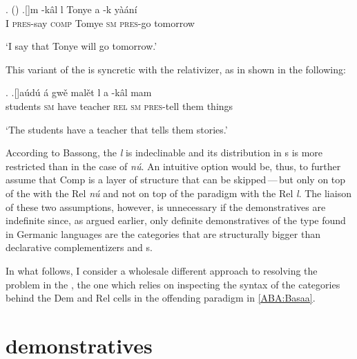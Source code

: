\ex.  (\citealt[ex. 30a in \S3]{Bassong2010})\label{bassong-ch3}
\ag.[]\hspace{-22pt}m -k\^al l Tonye a -k y\`a\'an\'i\\
\hspace{-22pt}I \textsc{pres}-say \textsc{comp} Tomye \textsc{sm} \textsc{pres}-go tomorrow\\
\hspace{-22pt}\strut `I say that Tonye will go tomorrow.'

This variant of the  is syncretic with the relativizer, as in shown in the following:

\ex. \citet[ex. 22b in \S4]{Bassong2010}\label{le-rel}
\ag.[]\hspace{-22pt}a\'ud\'u \'a gw\v{e} mal\v{e}t l a -k\^al  mam\\
\hspace{-22pt}students \textsc{sm} have teacher \textsc{rel} \textsc{sm} \textsc{pres-}tell them things\\
\hspace{-22pt}\strut `The students have a teacher that tells them stories.' 

According to Bassong, the  \textit{l} is indeclinable and its distribution in s is more restricted than in the case of \textit{n\'u}. 
An intuitive option would be, thus, to further assume that Comp is a layer of structure that can be skipped\,---\,but only on top of the  with the Rel \textit{n\'u} and not on top of the paradigm with the Rel \textit{l}. The liaison of these two assumptions, however, is unnecessary if the  demonstratives are indefinite since, as argued earlier, only definite demonstratives of the type found in Germanic languages are the categories that are structurally bigger than declarative complementizers and s. 
\par
In what follows, I consider a wholesale different approach to resolving the   problem in the , the one which relies on inspecting the syntax of the categories behind the Dem and Rel cells in the offending paradigm in \ref{ABA:Basaa}.

\section{ demonstratives}

